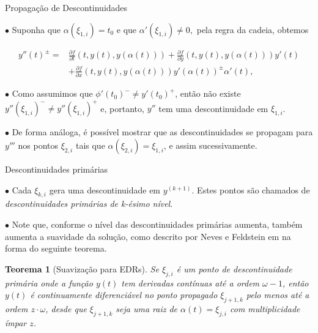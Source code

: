 \documentclass{beamer}
\theoremstyle{plain}
\newtheorem{teo}{Teorema}
\theoremstyle{definition}
\begin{document}

\begin{frame}{Propagação de Descontinuidades}

    $\bullet$ Suponha que $\alpha(\xi_{1, i}) = t_0 $ e que $ \alpha'(\xi_{1, i}) \neq 0, $ pela regra da cadeia, obtemos

    \begin{equation}
        \begin{aligned}
            y''(t)^{ \pm}= & \frac{\partial f}{\partial t}(t, y(t), y(\alpha(t)))+\frac{\partial f}{\partial y}(t, y(t), y(\alpha(t))) y'(t) \\
                           & +\frac{\partial f}{\partial x}(t, y(t), y(\alpha(t))) y'(\alpha(t))^{ \pm} \alpha'(t),
        \end{aligned}
        \label{chap2:eq:EDR:chain_rule}
    \end{equation}

    $\bullet$ Como assumimos que \(\phi'(t_{0})^{-} \neq y'(t_{0})^{+}\), então não existe \(y''(\xi_{1, i})^- \neq y''(\xi_{1, i})^+\) e, portanto, $y''$ tem uma descontinuidade em $\xi_{1, i}$.

    $\bullet$ De forma análoga, é possível mostrar que as descontinuidades se propagam para $y'''$ nos pontos $\xi_{2, i}$ tais que $\alpha(\xi_{2, i}) = \xi_{1, i}$, e assim sucessivamente. 

\end{frame}



\begin{frame}{Descontinuidades primárias}

    $\bullet$ Cada $\xi_{k, i}$ gera uma descontinuidade em $y^{(k+1)}$. Estes pontos são chamados de \textit{descontinuidades primárias de k-ésimo nível}.

    $\bullet$ Note que, conforme o nível das descontinuidades primárias aumenta, também aumenta a suavidade da solução, como descrito por Neves e Feldstein em \cite{Neves1976CharacterizationOJ} na forma do seguinte teorema.


    \begin{teo}[Suavização para EDRs]
        \label{chap2:teo:EDR_smooting}
        Se \(\xi_{j, i}\) é um ponto de descontinuidade primária onde a função \(y(t)\) tem derivadas contínuas até a ordem \(\omega-1\), então \(y(t)\) é continuamente diferenciável no ponto propagado \(\xi_{j+1, k}\) pelo menos até a ordem \(z \cdot \omega\), desde que \(\xi_{j+1, k}\) seja uma raiz de \(\alpha(t) = \xi_{j, i}\) com multiplicidade ímpar \(z\).
    \end{teo}

\end{frame}
\end{document}
